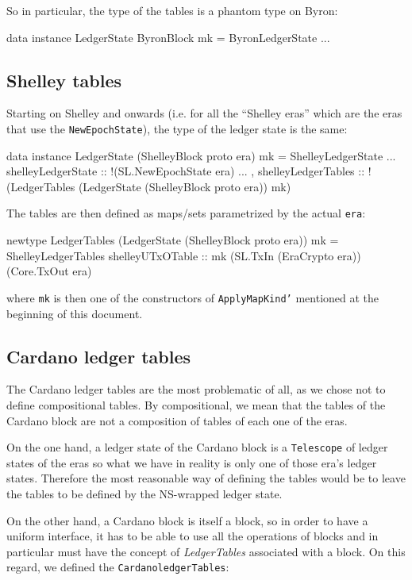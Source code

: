 \documentclass[11pt,a4paper]{article}
\newcommand{\htt}[1]{\texttt{#1}}
\theoremstyle{definition}
\begin{document}
So in particular, the type of the tables is a phantom type on Byron:

\begin{code}
data instance LedgerState ByronBlock mk = ByronLedgerState {
  ...
}
\end{code}

\subsection{Shelley tables}

Starting on Shelley and onwards (i.e. for all the ``Shelley eras'' which are the eras that use the \htt{NewEpochState}), the type of the ledger state is the same:

\begin{code}
data instance LedgerState (ShelleyBlock proto era) mk = ShelleyLedgerState {
  ...
  shelleyLedgerState      :: !(SL.NewEpochState era)
  ...
, shelleyLedgerTables     ::
      !(LedgerTables (LedgerState (ShelleyBlock proto era)) mk)
}
\end{code}

The tables are then defined as maps/sets parametrized by the actual \texttt{era}:

\begin{code}
newtype LedgerTables (LedgerState (ShelleyBlock proto era)) mk =
  ShelleyLedgerTables {
    shelleyUTxOTable :: mk (SL.TxIn (EraCrypto era)) (Core.TxOut era)
  }
\end{code}

where \htt{mk} is then one of the constructors of \htt{ApplyMapKind'} mentioned
at the beginning of this document.

\subsection{Cardano ledger tables}

The Cardano ledger tables are the most problematic of all, as we chose not to
define compositional tables. By compositional, we mean that the tables of the
Cardano block are not a composition of tables of each one of the eras.

On the one hand, a ledger state of the Cardano block is a \htt{Telescope} of
ledger states of the eras so what we have in reality is only one of those era's
ledger states. Therefore the most reasonable way of defining the tables would be
to leave the tables to be defined by the NS-wrapped ledger state.

On the other hand, a Cardano block is itself a block, so in order to have a
uniform interface, it has to be able to use all the operations of blocks and in
particular must have the concept of \emph{LedgerTables} associated with a block.
On this regard, we defined the \htt{CardanoledgerTables}:
\end{document}
